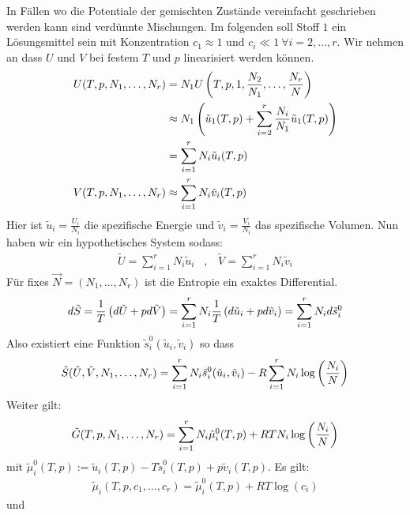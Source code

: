 In Fällen wo die Potentiale der gemischten Zustände vereinfacht geschrieben werden
kann sind verdünnte Mischungen. Im folgenden soll Stoff $1$ ein Lösungsmittel sein
mit Konzentration $c_1 \approx 1$ und $c_i \ll 1 \ \forall i = 2,\dots,r$. Wir nehmen
an dass $U$ und $V$ bei festem $T$ und $p$ linearisiert werden können.
\begin{align*}
    U(T,p,N_1,\dots,N_r) &= N_1 U \left( T,p,1,\frac{N_2}{N_1},\dots,\frac{N_r}{N} \right)
    \\
    &\approx N_1 \left( \tilde{u}_1 (T,p) + \sum_{i=2}^r \frac{N_i}{N_1} \tilde{u}_1 (T,p) \right)
    \\
    &= \sum_{i=1}^r N_i \tilde{u}_i (T,p)
    \\
    V(T,p,N_1,\dots,N_r) &\approx \sum_{i=1}^r N_i \tilde{v}_i (T,p)
\end{align*}
Hier ist $\tilde{u}_i = \frac{U_i}{N_i}$ die spezifische Energie und $\tilde{v}_i
= \frac{V_i}{N_i}$ das spezifische Volumen. Nun haben wir ein hypothetisches System
sodass:
\begin{align*}
    \tilde{U} = \sum_{i=1}^r N_i \tilde{u}_i
    \hspace{10pt} , \hspace{10pt}
    \tilde{V} = \sum_{i=1}^r N_i \tilde{v}_i
\end{align*}
Für fixes $\vec{N} = (N_1,\dots,N_r)$ ist die Entropie ein exaktes Differential.
\begin{align*}
    d \tilde{S} = \frac{1}{T} \left( d \tilde{U} + p d \tilde{V} \right)
    = \sum_{i=1}^r N_i \frac{1}{T} \left( d \tilde{u}_i + p d \tilde{v}_i \right)
    = \sum_{i=1}^r N_i d \tilde{s}_i^0
\end{align*}
Also existiert eine Funktion $\tilde{s}_i^0 (\tilde{u}_i,\tilde{v}_i)$ so dass
\begin{align*}
    \tilde{S}(\tilde{U},\tilde{V},N_1,\dots,N_r)
    = \sum_{i=1}^r N_i \tilde{s}_i^0 (\tilde{u}_i,\tilde{v}_i) - R \sum_{i=1}^r N_i \log \left( \frac{N_i}{N} \right)
\end{align*}
Weiter gilt:
\begin{align*}
    \tilde{G}(T,p,N_1,\dots,N_r) =
    \sum_{i=1}^r N_i \tilde{\mu}_i^0(T,p) + R T N_i \log \left( \frac{N_i}{N} \right)
\end{align*}
mit $\tilde{\mu}_i^0 (T,p) := \tilde{u}_i(T,p) - T \tilde{s}_i^0 (T,p) + p \tilde{v}_i (T,p)$.
Es gilt:
\begin{align*}
    \tilde{\mu}_i (T,p,c_1,\dots,c_r) = \tilde{\mu}_i^0 (T,p) + R T \log(c_i)
\end{align*}
und
